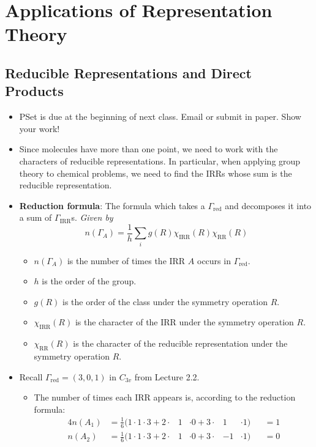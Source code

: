 \documentclass[../notes.tex]{subfiles}
\begin{document}
\chapter{Applications of Representation Theory}
\section{Reducible Representations and Direct Products}
\begin{itemize}
    \item {}PSet is due at the beginning of next class. Email or submit in paper. Show your work!
    \item Since molecules have more than one point, we need to work with the characters of reducible representations. In particular, when applying group theory to chemical problems, we need to find the IRRs whose sum is the reducible representation.
    \item \textbf{Reduction formula}: The formula which takes a $\Gamma_\text{red}$ and decomposes it into a sum of $\Gamma_\text{IRR}$s. \emph{Given by}
    \begin{equation*}
        n(\Gamma_A) = \frac{1}{h}\sum_ig(R)\chi_\text{IRR}(R)\chi_\text{RR}(R)
    \end{equation*}
    \begin{itemize}
        \item $n(\Gamma_A)$ is the number of times the IRR $A$ occurs in $\Gamma_\text{red}$.
        \item $h$ is the order of the group.
        \item $g(R)$ is the order of the class under the symmetry operation $R$.
        \item $\chi_\text{IRR}(R)$ is the character of the IRR under the symmetry operation $R$.
        \item $\chi_\text{RR}(R)$ is the character of the reducible representation under the symmetry operation $R$.
    \end{itemize}
    \item Recall $\Gamma_\text{red}=(3,0,1)$ in $C_{3v}$ from Lecture 2.2.
    \begin{itemize}
        \item The number of times each IRR appears is, according to the reduction formula:
        \begin{alignat*}{4}
            n(A_1) &= \frac{1}{6}(1\cdot 1\cdot 3+2\cdot{}&1&\cdot 0+3\cdot{}&1&\cdot 1) &&= 1\\
            n(A_2) &= \frac{1}{6}(1\cdot 1\cdot 3+2\cdot{}&1&\cdot 0+3\cdot{}&-1&\cdot 1) &&= 0\\

\end{alignat*}
\end{itemize}
\end{itemize}
\end{document}

